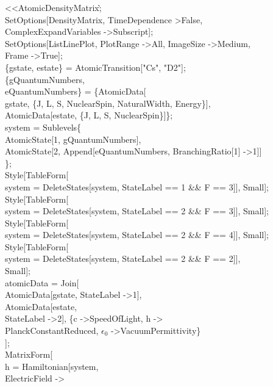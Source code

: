 \begin{enumerate}
\textless\textless AtomicDensityMatrix\`;\\
SetOptions[DensityMatrix, TimeDependence \textgreater False, \\
  ComplexExpandVariables -\textgreater Subscript];\\
SetOptions[ListLinePlot, PlotRange -\textgreater All, ImageSize -\textgreater Medium, \\
  Frame -\textgreater True];\\
\{gstate, estate\} = AtomicTransition["Cs", "D2"];\\
\{gQuantumNumbers, \\
   eQuantumNumbers\} = \{AtomicData[\\
    gstate, \{J, L, S, NuclearSpin, NaturalWidth, Energy\}],\\
   AtomicData[estate, \{J, L, S, NuclearSpin\}]\};\\
system = Sublevels\@\{\\
    AtomicState[1, gQuantumNumbers], \\
    AtomicState[2, Append[eQuantumNumbers, BranchingRatio[1] -\textgreater 1]]\\
    \};\\
Style[TableForm[\\
   system = DeleteStates[system, StateLabel == 1 \&\& F == 3]], Small];\\
Style[TableForm[\\
   system = DeleteStates[system, StateLabel == 2 \&\& F == 3]], Small];\\
Style[TableForm[\\
   system = DeleteStates[system, StateLabel == 2 \&\& F == 4]], Small];\\
Style[TableForm[\\
   system = DeleteStates[system, StateLabel == 2 \&\& F == 2]],\\
  Small];\\
atomicData = Join[\\
   AtomicData[gstate, StateLabel -\textgreater 1],\\
   AtomicData[estate, \\
    StateLabel -\textgreater 2], \{c -\textgreater SpeedOfLight, h -\textgreater \\
     PlanckConstantReduced, $\epsilon_0$ -\textgreater VacuumPermittivity\}\\
   ];\\
MatrixForm[\\
  h = Hamiltonian[system, \\
    ElectricField -\textgreater \\

\end{enumerate}
